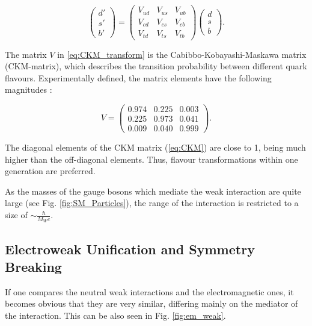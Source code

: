 \begin{equation} \label{eq:CKM_transform}
\left( \begin{array}{c} d' \\ s' \\ b' \end{array} \right) = 
\left( \begin{array}{ccc} V_{ud} & V_{us} & V_{ub} \\ V_{cd} & V_{cs} & V_{cb} \\ V_{td} & V_{ts} & V_{tb} \end{array} \right)
\left( \begin{array}{c} d \\ s \\ b\end{array} \right).
\end{equation}

The matrix $V$ in \ref{eq:CKM_transform} is the Cabibbo-Kobayashi-Maskawa matrix \cite{Kobayashi:1973fv} (CKM-matrix), which describes the transition probability 
between different quark flavours. Experimentally defined, the matrix elements have the following magnitudes \cite{PDG-2012}:

\begin{equation} \label{eq:CKM}
 V = \left( \begin{array}{ccc} 0.974 & 0.225 & 0.003 \\ 0.225 & 0.973 & 0.041 \\ 0.009 & 0.040 & 0.999 \end{array} \right).
\end{equation}

The diagonal elements of the CKM matrix (\ref{eq:CKM}) are close to 1, being much higher than the off-diagonal elements. Thus, flavour transformations
within one generation are preferred.

As the masses of the gauge bosons which mediate the weak interaction are quite large (see Fig. \ref{fig:SM_Particles}), the range of the interaction is restricted
to a size of $\sim \frac{\hbar}{M_{W}c}$.

\subsection{Electroweak Unification and Symmetry Breaking}

If one compares the neutral weak interactions and the electromagnetic ones, it becomes obvious that they are very similar, differing mainly on the mediator
of the interaction. This can be also seen in Fig. \ref{fig:em_weak}.


